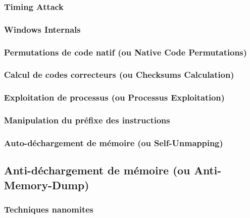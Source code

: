 \documentclass[10pt,a4paper]{article}
\begin{document}
\subsubsection{Timing Attack}                                            
 
\subsubsection{Windows Internals}                                        
 
\subsubsection{Permutations de code natif (ou Native Code Permutations)} 
 
\subsubsection{Calcul de codes correcteurs (ou Checksums Calculation)}   
 
\subsubsection{Exploitation de processus (ou Processus Exploitation)}    
 
\subsubsection{Manipulation du préfixe des instructions}                 
 
\subsubsection{Auto-déchargement de mémoire (ou Self-Unmapping)}         
 

\subsection{Anti-déchargement de mémoire (ou Anti-Memory-Dump)}
\subsubsection{Techniques nanomites}       
 
\end{document}
